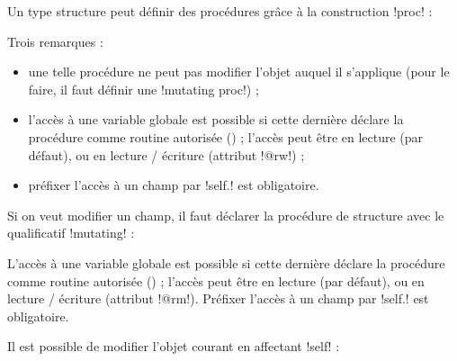 
Un type structure peut définir des procédures grâce à la construction \plm!proc! :


Trois remarques :
\begin{itemize}
  \item une telle procédure ne peut pas modifier l'objet auquel il s'applique (pour le faire, il faut définir une \plm!mutating proc!) ;
  \item l'accès à une variable globale est possible si cette dernière déclare la procédure comme routine autorisée () ; l'accès peut être en lecture (par défaut), ou en lecture / écriture (attribut \plm!@rw!) ;
  \item préfixer l'accès à un champ par \plm!self.! est obligatoire. 
\end{itemize}





Si on veut modifier un champ, il faut déclarer la procédure de structure avec le qualificatif \plm!mutating! :


L'accès à une variable globale est possible si cette dernière déclare la procédure comme routine autorisée () ; l'accès peut être en lecture (par défaut), ou en lecture / écriture (attribut \plm!@rm!). Préfixer l'accès à un champ par \plm!self.! est obligatoire. 

Il est possible de modifier l'objet courant en affectant \plm!self! :


